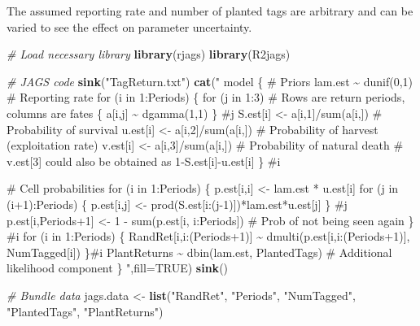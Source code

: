 \documentclass[
]{krantz}
\makeatletter
\newenvironment{Shaded}{\begin{snugshade}}{\end{snugshade}}
\newcommand{\AttributeTok}[1]{\textcolor[rgb]{0.27,0.27,0.27}{#1}}
\newcommand{\CommentTok}[1]{\textcolor[rgb]{0.37,0.37,0.37}{\textit{#1}}}
\newcommand{\ConstantTok}[1]{\textcolor[rgb]{0.37,0.37,0.37}{#1}}
\newcommand{\FunctionTok}[1]{\textcolor[rgb]{0.27,0.27,0.27}{\textbf{#1}}}
\newcommand{\NormalTok}[1]{#1}
\newcommand{\OtherTok}[1]{\textcolor[rgb]{0.37,0.37,0.37}{#1}}
\newcommand{\StringTok}[1]{\textcolor[rgb]{0.5,0.5,0.5}{#1}}
\newenvironment{kframe}{%
\medskip{}
\setlength{\fboxsep}{.8em}
 \def\at@end@of@kframe{}%
 \ifinner\ifhmode%
  \def\at@end@of@kframe{\end{minipage}}%
  \begin{minipage}{\columnwidth}%
 \fi\fi%
 \def\FrameCommand##1{\hskip\@totalleftmargin \hskip-\fboxsep
 \colorbox{shadecolor}{##1}\hskip-\fboxsep
     \hskip-\linewidth \hskip-\@totalleftmargin \hskip\columnwidth}%
 \MakeFramed {\advance\hsize-\width
   \@totalleftmargin\z@ \linewidth\hsize
   \@setminipage}}%
 {\par\unskip\endMakeFramed%
 \at@end@of@kframe}
\renewenvironment{Shaded}{\begin{kframe}}{\end{kframe}}
\makeatother
\begin{document}
The assumed reporting rate and number of planted tags are arbitrary and can be varied to see the effect on parameter uncertainty.

\begin{Shaded}
\begin{Highlighting}[]
\CommentTok{\# Load necessary library}
\FunctionTok{library}\NormalTok{(rjags)}
\FunctionTok{library}\NormalTok{(R2jags)}

\CommentTok{\# JAGS code}
  \FunctionTok{sink}\NormalTok{(}\StringTok{"TagReturn.txt"}\NormalTok{)}
  \FunctionTok{cat}\NormalTok{(}\StringTok{"}
\StringTok{  model \{}
\StringTok{  \# Priors}
\StringTok{  lam.est \textasciitilde{} dunif(0,1) \# Reporting rate}
\StringTok{  for (i in 1:Periods) \{}
\StringTok{     for (j in 1:3) \# Rows are return periods, columns are fates}
\StringTok{       \{}
\StringTok{         a[i,j] \textasciitilde{} dgamma(1,1)}
\StringTok{       \} \#j}
\StringTok{     S.est[i] \textless{}{-} a[i,1]/sum(a[i,]) \# Probability of survival}
\StringTok{     u.est[i] \textless{}{-} a[i,2]/sum(a[i,]) \# Probability of harvest (exploitation rate)}
\StringTok{     v.est[i] \textless{}{-} a[i,3]/sum(a[i,]) \# Probability of natural death}
\StringTok{     \# v.est[3] could also be obtained as 1{-}S.est[i]{-}u.est[i]}
\StringTok{  \} \#i}

\StringTok{\# Cell probabilities}
\StringTok{  for (i in 1:Periods) \{}
\StringTok{    p.est[i,i] \textless{}{-} lam.est * u.est[i]}
\StringTok{    for (j in (i+1):Periods) \{}
\StringTok{      p.est[i,j] \textless{}{-} prod(S.est[i:(j{-}1)])*lam.est*u.est[j]}
\StringTok{      \} \#j}
\StringTok{    p.est[i,Periods+1] \textless{}{-} 1 {-} sum(p.est[i, i:Periods])   \# Prob of not being seen again}
\StringTok{    \} \#i}
\StringTok{  for (i in 1:Periods) \{}
\StringTok{  RandRet[i,i:(Periods+1)] \textasciitilde{} dmulti(p.est[i,i:(Periods+1)], NumTagged[i])}
\StringTok{  \}\#i}
\StringTok{  PlantReturns \textasciitilde{} dbin(lam.est, PlantedTags) \# Additional likelihood component}
\StringTok{ \}}
\StringTok{  "}\NormalTok{,}\AttributeTok{fill=}\ConstantTok{TRUE}\NormalTok{)}
  \FunctionTok{sink}\NormalTok{()}

\CommentTok{\# Bundle data}
\NormalTok{  jags.data }\OtherTok{\textless{}{-}} \FunctionTok{list}\NormalTok{(}\StringTok{"RandRet"}\NormalTok{, }\StringTok{"Periods"}\NormalTok{, }\StringTok{"NumTagged"}\NormalTok{, }\StringTok{"PlantedTags"}\NormalTok{, }\StringTok{"PlantReturns"}\NormalTok{)}


\end{Highlighting}
\end{Shaded}
\end{document}
